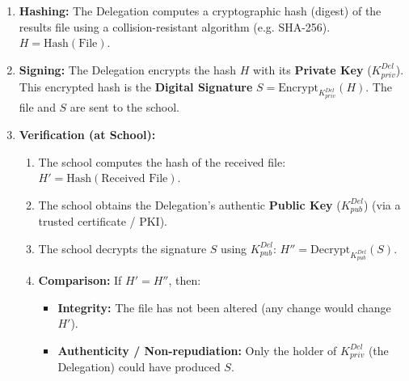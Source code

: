 \documentclass[11pt]{article}
\begin{document}
\begin{corrige}
\begin{enumerate}
\begin{enumerate}
\item \textbf{Hashing:} The Delegation computes a cryptographic hash (digest) of the results file using a collision-resistant algorithm (e.g. SHA-256). $H = \text{Hash}(\text{File})$.
\item \textbf{Signing:} The Delegation encrypts the hash $H$ with its \textbf{Private Key} ($K_{priv}^{Del}$). This encrypted hash is the \textbf{Digital Signature} $S = \text{Encrypt}_{K_{priv}^{Del}}(H)$. The file and $S$ are sent to the school.
\item \textbf{Verification (at School):}
\begin{enumerate}
\item The school computes the hash of the received file: $H' = \text{Hash}(\text{Received File})$.
\item The school obtains the Delegation's authentic \textbf{Public Key} ($K_{pub}^{Del}$) (via a trusted certificate / PKI).
\item The school decrypts the signature $S$ using $K_{pub}^{Del}$: $H'' = \text{Decrypt}_{K_{pub}^{Del}}(S)$.
\item \textbf{Comparison:} If $H' = H''$, then:
\begin{itemize}
\item \textbf{Integrity:} The file has not been altered (any change would change $H'$).
\item \textbf{Authenticity / Non-repudiation:} Only the holder of $K_{priv}^{Del}$ (the Delegation) could have produced $S$.
\end{itemize}
\end{enumerate}
\end{enumerate}
\end{enumerate}
\end{corrige}
\end{document}
